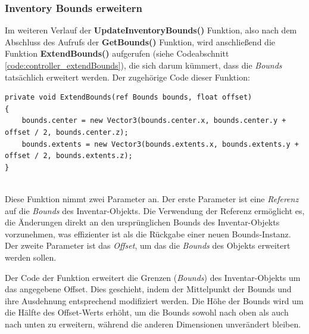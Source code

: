 \subsubsection{Inventory Bounds erweitern}
Im weiteren Verlauf der \textbf{UpdateInventoryBounds()} Funktion, also nach dem Abschluss des Aufrufs der \textbf{GetBounds()}
Funktion, wird anschließend die Funktion \textbf{ExtendBounds()} aufgerufen (siehe Codeabschnitt \ref{code:controller_extendBounds}),
die sich darum kümmert, dass die \textit{Bounds} tatsächlich erweitert werden. Der zugehörige Code dieser Funktion:
\begin{lstlisting}[style=csharp, caption={Funktion um Bounds zu erweitern}, label=code:controller_extendBounds]
private void ExtendBounds(ref Bounds bounds, float offset)
{
    bounds.center = new Vector3(bounds.center.x, bounds.center.y + offset / 2, bounds.center.z);
    bounds.extents = new Vector3(bounds.extents.x, bounds.extents.y + offset / 2, bounds.extents.z);
}
\end{lstlisting}\\
Diese Funktion nimmt zwei Parameter an. Der erste Parameter ist eine \textit{Referenz} auf die \textit{Bounds} des
Inventar-Objekts. Die Verwendung der Referenz ermöglicht es, die Änderungen direkt an den ursprünglichen Bounds des
Inventar-Objekts vorzunehmen, was effizienter ist als die Rückgabe einer neuen Bounds-Instanz. Der zweite Parameter ist
das \textit{Offset}, um das die \textit{Bounds} des Objekts erweitert werden sollen.

Der Code der Funktion erweitert die Grenzen (\textit{Bounds}) des Inventar-Objekts um das angegebene Offset. Dies geschieht,
indem der Mittelpunkt der Bounds und ihre Ausdehnung entsprechend modifiziert werden. Die Höhe der Bounds wird um die
Hälfte des Offset-Werts erhöht, um die Bounds sowohl nach oben als auch nach unten zu erweitern, während die anderen
Dimensionen unverändert bleiben.


